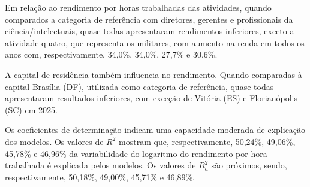 \documentclass[12pt,a4paper,header]{abnt}
\begin{document}
Em relação ao rendimento por horas trabalhadas das atividades, quando comparados a categoria de referência com diretores, gerentes e profissionais da ciência/intelectuais, quase todas apresentaram rendimentos inferiores, exceto a atividade quatro, que representa os militares, com aumento na renda em todos os anos com, respectivamente, 34,0\%, 34,0\%, 27,7\% e 30,6\%.

A capital de residência também influencia no rendimento. Quando comparadas à capital Brasília (DF), utilizada como categoria de referência, quase todas apresentaram resultados inferiores, com exceção de Vitória (ES) e Florianópolis (SC) em 2025.

Os coeficientes de determinação indicam uma capacidade moderada de explicação dos modelos. Os valores de $R^2$ mostram que, respectivamente, 50,24\%, 49,06\%, 45,78\% e 46,96\% da variabilidade do logaritmo do rendimento por hora trabalhada é explicada pelos modelos. Os valores de $R^2_a$ são próximos, sendo, respectivamente, 50,18\%, 49,00\%, 45,71\% e 46,89\%.
\FloatBarrier
\end{document}
